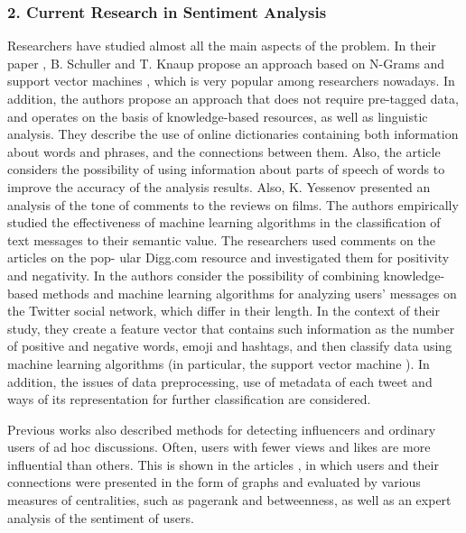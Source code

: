 \subsubsection{2. Current Research in Sentiment Analysis}

Researchers have studied almost all the main aspects of the problem. In their paper \cite{SchullerKnaup}, B. Schuller and T. Knaup propose an approach based on N-Grams and support vector machines \cite{ScholkopfCristianini}, which is very popular among researchers nowadays. In addition, the authors propose an approach that does not require pre-tagged data, and operates on the basis of knowledge-based resources, as well as linguistic analysis. They describe the use of online dictionaries containing both information about words and phrases, and the connections between them. Also, the article considers the possibility of using information about parts of speech of words to improve the accuracy of the analysis results. Also, K. Yessenov \cite{MisailovicYessenov} presented an analysis of the tone of comments to the reviews on films. The authors empirically studied the effectiveness of machine learning algorithms in the classification of text messages to their semantic value. The researchers used comments on the articles on the pop- ular Digg.com resource and investigated them for positivity and negativity. In \cite{RavindranSuchdevKotkar} the authors consider the possibility of combining knowledge-based methods and machine learning algorithms for analyzing users’ messages on the Twitter social network, which differ in their length. In the context of their study, they create a feature vector that contains such information as the number of positive and negative words, emoji and hashtags, and then classify data using machine learning algorithms (in particular, the support vector machine \cite{ScholkopfCristianini}). In addition, the issues of data preprocessing, use of metadata of each tweet and ways of its representation for further classification are considered.

Previous works also described methods for detecting influencers and ordinary users of ad hoc discussions. Often, users with fewer views and likes are more influential than others. This is shown in the articles \cite{BodrunovaLitvinenkoBlekanov2016,BodrunovaLitvinenkoBlekanov2017}, in which users and their connections were presented in the form of graphs and evaluated by various measures of centralities, such as pagerank and betweenness, as well as an expert analysis of the sentiment of users.

